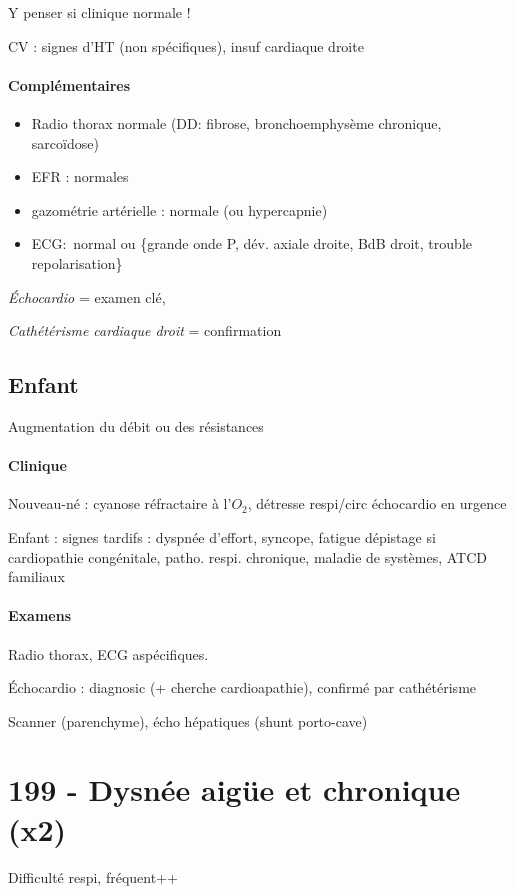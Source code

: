 Y penser si clinique normale !

CV : signes d'HT (non spécifiques), insuf cardiaque droite
\paragraph{Complémentaires}
\begin{itemize}
  \item Radio thorax normale (DD: fibrose, bronchoemphysème chronique,
    sarcoïdose)
  \item EFR : normales
  \item gazométrie artérielle : normale (ou hypercapnie)
  \item ECG: normal ou \{grande onde P, dév. axiale droite, BdB droit, trouble
    repolarisation\}
\end{itemize}
\textit{Échocardio}  = examen clé, 

\textit{Cathétérisme cardiaque droit}  = confirmation

\subsection{Enfant}

Augmentation du débit ou des résistances

\paragraph{Clinique}
Nouveau-né : cyanose réfractaire à l'$O_2$, détresse respi/circ \thus échocardio en
urgence \danger

Enfant : signes tardifs : dyspnée d'effort, syncope, fatigue
\thus dépistage si cardiopathie congénitale, patho. respi. chronique, maladie de
systèmes, ATCD familiaux

\paragraph{Examens}
Radio thorax, ECG aspécifiques.

Échocardio : diagnosic (+ cherche cardioapathie), confirmé par cathétérisme 

Scanner (parenchyme), écho hépatiques (shunt porto-cave)

\section{199 - Dysnée aigüe et chronique (x2)}%
\label{sec:199_dysnee_aigue_et_chronique}
Difficulté respi, fréquent++

